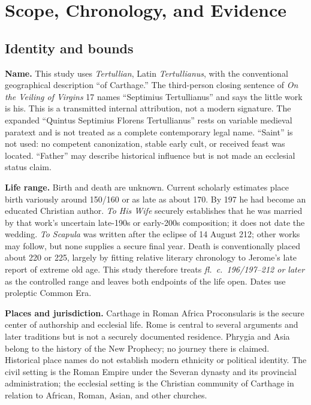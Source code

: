 \section{Scope, Chronology, and Evidence}
\label{sec:tertullian-apparatus}

\subsection{Identity and bounds}

\textbf{Name.} This study uses \emph{Tertullian}, Latin \emph{Tertullianus},
with the conventional geographical description ``of Carthage.'' The
third-person closing sentence of \emph{On the Veiling of Virgins} 17 names
``Septimius Tertullianus'' and says the little work is his. This is a
transmitted internal attribution, not a modern signature. The expanded
``Quintus Septimius Florens Tertullianus'' rests on variable medieval paratext
and is not treated as a complete contemporary legal name. ``Saint'' is not
used: no competent canonization, stable early cult, or received feast was
located. ``Father'' may describe historical influence but is not made an
ecclesial status claim.

\textbf{Life range.} Birth and death are unknown. Current scholarly estimates
place birth variously around 150/160 or as late as about 170. By 197 he had
become an educated Christian author. \emph{To His Wife} securely establishes
that he was married by that work's uncertain late-190s or early-200s
composition; it does not date the wedding. \emph{To Scapula} was written after
the eclipse of 14 August 212; other works may follow, but none supplies a
secure final year. Death is conventionally placed about 220 or 225, largely by
fitting relative literary chronology to Jerome's late report of extreme old
age. This study therefore treats \emph{fl.~c.~196/197--212 or later} as the
controlled range and leaves both endpoints of the life open. Dates use
proleptic Common Era.

\textbf{Places and jurisdiction.} Carthage in Roman Africa Proconsularis is the
secure center of authorship and ecclesial life. Rome is central to several
arguments and later traditions but is not a securely documented residence.
Phrygia and Asia belong to the history of the New Prophecy; no journey there is
claimed. Historical place names do not establish modern ethnicity or political
identity. The civil setting is the Roman Empire under the Severan dynasty and
its provincial administration; the ecclesial setting is the Christian
community of Carthage in relation to African, Roman, Asian, and other churches.

